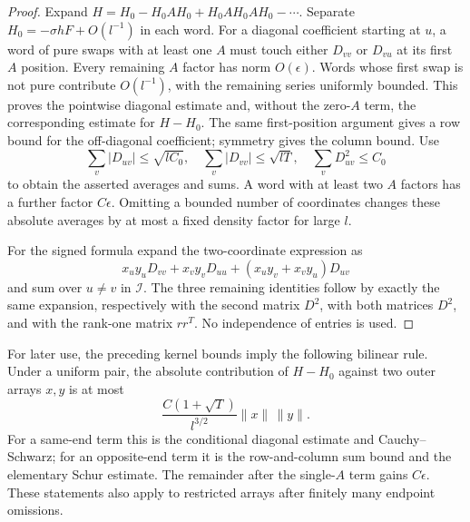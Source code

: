 \begin{proof}
Expand
$H=H_0-H_0AH_0+H_0AH_0AH_0-\cdots$.
Separate $H_0=-\sigma hF+O(l^{-1})$ in each word.
For a diagonal coefficient starting at $u$, a word of pure swaps
with at least one $A$ must touch either $D_{vv}$ or $D_{vu}$ at its
first $A$ position.  Every remaining $A$ factor has norm
$O(\epsilon)$.  Words whose first swap is not pure contribute
$O(l^{-1})$, with the remaining series uniformly bounded.
This proves the pointwise diagonal estimate and, without the
zero-$A$ term, the corresponding estimate for $H-H_0$.
The same first-position argument gives a row bound for the
off-diagonal coefficient; symmetry gives the column bound.
Use
\[
 \sum_v|D_{uv}|\le \sqrt{lC_0},\quad
 \sum_v|D_{vv}|\le\sqrt{lT},\quad
 \sum_v D_{uv}^2\le C_0
\]
to obtain the asserted averages and sums.  A word with at least two
$A$ factors has a further factor $C\epsilon$.  Omitting a bounded
number of coordinates changes these absolute averages by at most a
fixed density factor for large $l$.

For the signed formula expand the two-coordinate expression as
\[
 x_uy_uD_{vv}+x_vy_vD_{uu}
              +(x_uy_v+x_vy_u)D_{uv}
\]
and sum over $u\ne v$ in $\mathcal I$.  The three remaining
identities follow by exactly the same expansion, respectively with
the second matrix $D^2$, with both matrices $D^2$, and with the
rank-one matrix $rr^T$.  No independence of entries is used.
\end{proof}

For later use, the preceding kernel bounds imply the following
bilinear rule.  Under a uniform pair, the absolute contribution of
$H-H_0$ against two outer arrays $x,y$ is at most
\[
 \frac{C(1+\sqrt T)}{l^{3/2}}\|x\|\,\|y\|.
\]
For a same-end term this is the conditional diagonal estimate and
Cauchy--Schwarz; for an opposite-end term it is the row-and-column
sum bound and the elementary Schur estimate.  The remainder after
the single-$A$ term gains $C\epsilon$.  These statements also apply
to restricted arrays after finitely many endpoint omissions.

